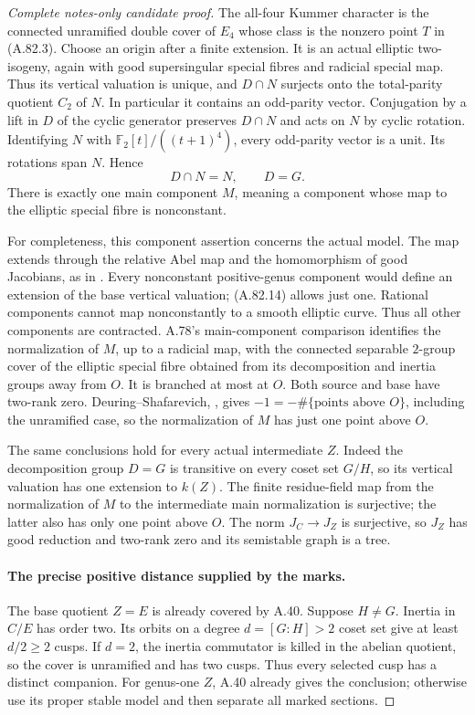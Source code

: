 \begin{proof}[Complete notes-only candidate proof]
The all-four Kummer character is the connected unramified double
cover of \(E_4\) whose class is the nonzero point \(T\) in
(A.82.3). Choose an origin after a finite extension. It is an actual
elliptic two-isogeny, again with good supersingular special fibres
and radicial special map. Thus its vertical valuation is unique,
and \(D\cap N\) surjects onto the total-parity quotient \(C_2\)
of \(N\). In particular it contains an odd-parity vector.
Conjugation by a lift in \(D\) of the cyclic generator preserves
\(D\cap N\) and acts on \(N\) by cyclic rotation. Identifying
\(N\) with \(\mathbb F_2[t]/((t+1)^4)\), every odd-parity
vector is a unit. Its rotations span \(N\). Hence
\[
                         D\cap N=N,\qquad D=G.         \tag{A.82.14}
\]
There is exactly one main component \(M\), meaning a component
whose map to the elliptic special fibre is nonconstant.

For completeness, this component assertion concerns the actual
model. The map extends through the relative Abel map and the
homomorphism of good Jacobians, as in
\cite[Theorem 1.1 and Proposition 3.2]{fghDupuyRabinoff}. Every nonconstant positive-genus component
would define an extension of the base vertical valuation; (A.82.14)
allows just one. Rational components cannot map nonconstantly to
a smooth elliptic curve. Thus all other components are contracted.
A.78's main-component comparison identifies the normalization of
\(M\), up to a radicial map, with the connected separable
\(2\)-group cover of the elliptic special fibre obtained from
its decomposition and inertia groups away from \(O\). It is
branched at most at \(O\). Both source and base have two-rank
zero. Deuring--Shafarevich, \cite[Corollary 1.8]{fghCrew1984}, gives
\(-1=-\#\{\text{points above }O\}\), including the unramified
case, so the normalization of \(M\) has just one point above
\(O\).

The same conclusions hold for every actual intermediate \(Z\).
Indeed the decomposition group \(D=G\) is transitive on every
coset set \(G/H\), so its vertical valuation has one extension
to \(k(Z)\). The finite residue-field map from the normalization
of \(M\) to the intermediate main normalization is surjective;
the latter also has only one point above \(O\). The norm
\(J_C\to J_Z\) is surjective, so \(J_Z\) has good reduction
and two-rank zero and its semistable graph is a tree.

\paragraph{The precise positive distance supplied by the marks.}
The base quotient \(Z=E\) is already covered by A.40.
Suppose \(H\ne G\). Inertia in \(C/E\) has order two.
Its orbits on a degree \(d=[G:H]>2\) coset set give at least
\(d/2\ge2\) cusps. If \(d=2\), the inertia commutator is
killed in the abelian quotient, so the cover is unramified and
has two cusps. Thus every selected cusp has a distinct companion.
For genus-one \(Z\), A.40 already gives the conclusion; otherwise
use its proper stable model and then separate all marked sections.


\end{proof}
